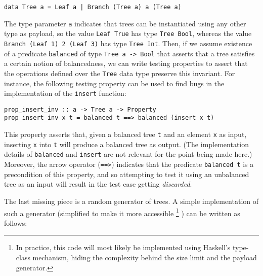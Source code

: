 \documentclass[sigconf, anonymous, review]{acmart}
\newcommand{\quickcheck}{\textit{QuickCheck}\xspace}
\begin{document}
\begin{verbatim}
data Tree a = Leaf a | Branch (Tree a) a (Tree a)
\end{verbatim}

\noindent The type parameter \texttt{a} indicates that trees can be instantiated
using any other type as payload, so the value \texttt{Leaf True} has type
\texttt{Tree Bool}, whereas the value \texttt{Branch (Leaf 1) 2 (Leaf 3)} has
type \texttt{Tree Int}.
%
%
%
%
Then, if we assume existence of a predicate \texttt{balanced} of type
\texttt{Tree a -> Bool} that asserts that a tree satisfies a certain notion of
balancedness, we can write testing properties to assert that the operations
defined over the \texttt{Tree} data type preserve this invariant.
%
For instance, the following testing property can be used to find bugs in the
implementation of the \texttt{insert} function:

\begin{verbatim}
prop_insert_inv :: a -> Tree a -> Property
prop_insert_inv x t = balanced t ==> balanced (insert x t)
\end{verbatim}


\noindent This property asserts that, given a balanced tree \texttt{t} and an
element \texttt{x} as input, inserting \texttt{x} into \texttt{t} will produce a
balanced tree as output.
%
(The implementation details of \texttt{balanced} and \texttt{insert} are not
relevant for the point being made here.)
%
Moreover, the arrow operator (\texttt{==>}) indicates that the predicate
\texttt{balanced t} is a precondition of this property, and so attempting to
test it using an unbalanced tree as an input will result in the test case
getting \emph{discarded}.


The last missing piece is a random generator of trees.
%
A simple implementation of such a generator (simplified to make it more
accessible%
\footnote{In practice, this code will most likely be implemented using Haskell's
  type-class mechanism, hiding the complexity behind the size limit and the payload generator.}%
) can be written as follows:
\end{document}
